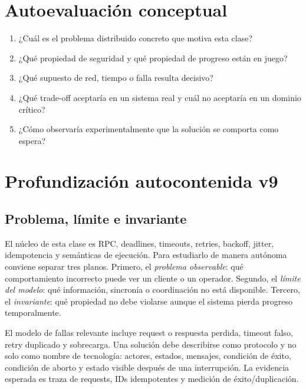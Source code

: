 \documentclass[variant=apuntes,cover=institutional,mode=screen]{ua-engineering-v6-article}
\begin{document}
\section{Autoevaluación conceptual}
\begin{enumerate}
\item ¿Cuál es el problema distribuido concreto que motiva esta clase?
\item ¿Qué propiedad de seguridad y qué propiedad de progreso están en juego?
\item ¿Qué supuesto de red, tiempo o falla resulta decisivo?
\item ¿Qué trade-off aceptaría en un sistema real y cuál no aceptaría en un dominio crítico?
\item ¿Cómo observaría experimentalmente que la solución se comporta como espera?
\end{enumerate}

\section{Profundización autocontenida v9}
\subsection{Problema, límite e invariante}
El núcleo de esta clase es RPC, deadlines, timeouts, retries, backoff, jitter, idempotencia y semánticas de ejecución. Para estudiarlo de manera autónoma conviene separar tres planos. Primero, el \emph{problema observable}: qué comportamiento incorrecto puede ver un cliente o un operador. Segundo, el \emph{límite del modelo}: qué información, sincronía o coordinación no está disponible. Tercero, el \emph{invariante}: qué propiedad no debe violarse aunque el sistema pierda progreso temporalmente.

El modelo de fallas relevante incluye request o respuesta perdida, timeout falso, retry duplicado y sobrecarga. Una solución debe describirse como protocolo y no solo como nombre de tecnología: actores, estados, mensajes, condición de éxito, condición de aborto y estado visible después de una interrupción. La evidencia esperada es traza de requests, IDs idempotentes y medición de éxito/duplicación.
\end{document}
